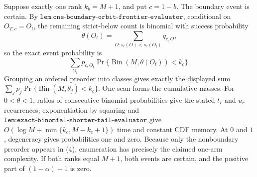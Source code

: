 Suppose exactly one rank \(k_b=M+1\), and put \(c=1-b\). The boundary event is certain. By \(\texttt{lem:one-boundary-orbit-frontier-evaluator}\), conditional on \(O_{T,c}=O_t\), the remaining strict-below count is binomial with success probability
\[
\theta(O_t)=\sum_{O:s_c(O)<s_c(O_t)}q_{c,O},
\]
so the exact event probability is
\[
\sum_{O_t}p_{c,O_t}\Pr\{\operatorname{Bin}(M,\theta(O_t))<k_c\}.
\tag{4}
\]
Grouping an ordered preorder into classes gives exactly the displayed sum \(\sum_jp_j\Pr\{\operatorname{Bin}(M,\theta_j)<k_c\}\). One scan forms the cumulative masses. For \(0<\theta<1\), ratios of consecutive binomial probabilities give the stated \(t_r\) and \(u_r\) recurrences; exponentiation by squaring and \(\texttt{lem:exact-binomial-shorter-tail-evaluator}\) give \(O(\log M+\min\{k_c,M-k_c+1\})\) time and constant CDF memory. At \(0\) and \(1\), degeneracy gives probabilities one and zero. Because only the nonboundary preorder appears in (4), enumeration has precisely the claimed one-arm complexity. If both ranks equal \(M+1\), both events are certain, and the positive part of \((1-\alpha)-1\) is zero.

